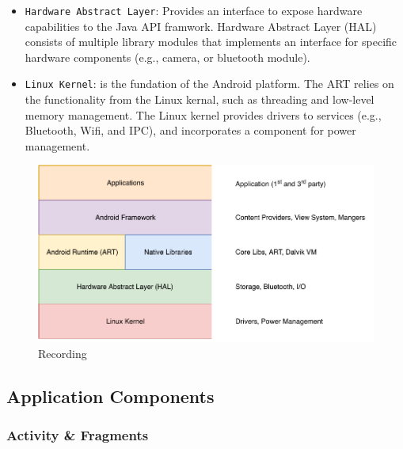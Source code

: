 \begin{itemize}
    \item \verb|Hardware Abstract Layer|: Provides an interface to expose hardware capabilities to the Java API framwork. Hardware Abstract Layer (HAL) consists of multiple library modules that implements an interface for specific hardware components (e.g., camera, or bluetooth module).
    \item \verb|Linux Kernel|: is the fundation of the Android platform. The ART relies on the functionality from the Linux kernal, such as threading and low-level memory management. The Linux kernel provides drivers to services (e.g., Bluetooth, Wifi, and IPC), and incorporates a component for power management. 
\end{itemize} 

\begin{figure}
    \centering
    \includegraphics[scale=0.85]{images/Android.pdf}
    \caption{Recording}
    \label{fig:hta_recording}
\end{figure}

\subsection{Application Components}
\subsubsection{Activity \& Fragments}

